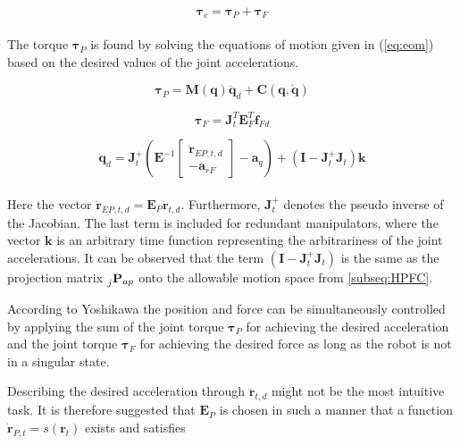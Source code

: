 \begin{equation}\label{eq:dhpfc_tau_c}
    \boldsymbol{\tau}_c = \boldsymbol{\tau}_P + \boldsymbol{\tau}_F
\end{equation}
\\
The torque $\boldsymbol{\tau}_P$ is found by solving the equations of motion given in (\ref{eq:eom}) based on the desired values of the joint accelerations.

\begin{equation}\label{eq:dhpfc_taup}
    \boldsymbol{\tau}_P = \mathbf{M(q)} \ddot{\mathbf{q}}_d + \mathbf{C}(\mathbf{q,\dot{q}})
\end{equation}

\begin{equation}\label{eq:dhpfc_tauf}
    \boldsymbol{\tau}_F = \mathbf{J}_t^T \mathbf{E}^T_F \mathbf{f}_{Fd}
\end{equation}

\begin{equation}\label{eq:dhpfc_qddd}
    \ddot{\mathbf{q}}_d = \mathbf{J}_t^+ (\mathbf{E}^{-1} 
    \begin{bmatrix}
        \mathbf{\ddot{r}}_{EP,t,d} \\
        - \mathbf{a}_{rF}
    \end{bmatrix}
    - \mathbf{a}_q) + (\mathbf{I}-  \mathbf{J}_t^+ \mathbf{J}_t)\mathbf{k}
\end{equation}
\\
Here the vector $\mathbf{\ddot{r}}_{EP,t,d} = \mathbf{E}_P \mathbf{\ddot{r}}_{t,d}$. Furthermore, $\mathbf{J}_t^+$ denotes the pseudo inverse of the Jacobian.
The last term is included for redundant manipulators, where the vector $\mathbf{k}$ is an arbitrary time function representing the arbitrariness of the joint accelerations. It can be observed that the term $ (\mathbf{I}-  \mathbf{J}_t^+ \mathbf{J}_t)$ is the same as the projection matrix $\prescript{}{j}{\mathbf{P}}_{ap}$ onto the allowable motion space from \ref{subseq:HPFC}.

According to Yoshikawa \cite{yoshikawa1987dynamic} the position and force can be simultaneously controlled by applying the sum of the joint torque $\boldsymbol{\tau}_P$ for achieving the desired acceleration and the joint torque $\boldsymbol{\tau}_F$ for achieving the desired force as long as the robot is not in a singular state.

Describing the desired acceleration through $\mathbf{\ddot{r}}_{t,d}$ might not be the most intuitive task. It is therefore suggested that $\mathbf{E}_P$ is chosen in such a manner that a function $\mathbf{\dot{r}}_{P,t} = s(\mathbf{r}_t)$ exists and satisfies

